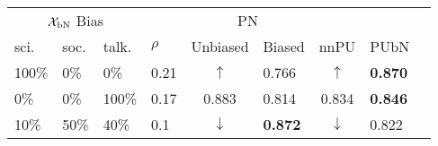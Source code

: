 \begin{tabular}{@{}lllllllll@{}}
  \toprule
  \multicolumn{3}{c}{$\mathcal{X}_{\textnormal{bN}}$ Bias} &    & \multicolumn{2}{c}{PN} &       &      \\\cmidrule{1-3}\cmidrule{5-6}
  sci.   & soc.   & talk.       & $\rho$   & Unbiased                          & Biased          & nnPU                             & PUbN \\\midrule
  100\%  & 0\%    & 0\%         & 0.21     & \multicolumn{1}{c}{$\uparrow$}    & 0.766           & \multicolumn{1}{c}{$\uparrow$}   & \textbf{0.870}\\
  0\%    & 0\%    & 100\%       & 0.17     & \multicolumn{1}{c}{0.883}         & 0.814           & \multicolumn{1}{c}{0.834}        & \textbf{0.846} \\
  10\%   & 50\%   & 40\%        & 0.1      & \multicolumn{1}{c}{$\downarrow$}  & \textbf{0.872}  & \multicolumn{1}{c}{$\downarrow$} & 0.822 \\
  \bottomrule
\end{tabular}
